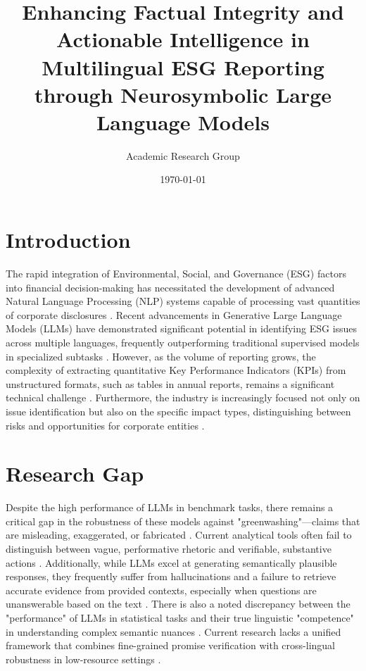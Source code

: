 \documentclass{article}
\title{Enhancing Factual Integrity and Actionable Intelligence in Multilingual ESG Reporting through Neurosymbolic Large Language Models}
\author{Academic Research Group}
\date{\today}
\begin{document}
\maketitle

\section{Introduction}
The rapid integration of Environmental, Social, and Governance (ESG) factors into financial decision-making has necessitated the development of advanced Natural Language Processing (NLP) systems capable of processing vast quantities of corporate disclosures \citep{cite_026}. Recent advancements in Generative Large Language Models (LLMs) have demonstrated significant potential in identifying ESG issues across multiple languages, frequently outperforming traditional supervised models in specialized subtasks \citep{cite_019, cite_024}. However, as the volume of reporting grows, the complexity of extracting quantitative Key Performance Indicators (KPIs) from unstructured formats, such as tables in annual reports, remains a significant technical challenge \citep{cite_030}. Furthermore, the industry is increasingly focused not only on issue identification but also on the specific impact types, distinguishing between risks and opportunities for corporate entities \citep{cite_025, cite_016}.

\section{Research Gap}
Despite the high performance of LLMs in benchmark tasks, there remains a critical gap in the robustness of these models against "greenwashing"—claims that are misleading, exaggerated, or fabricated \citep{cite_032}. Current analytical tools often fail to distinguish between vague, performative rhetoric and verifiable, substantive actions \citep{cite_032}. Additionally, while LLMs excel at generating semantically plausible responses, they frequently suffer from hallucinations and a failure to retrieve accurate evidence from provided contexts, especially when questions are unanswerable based on the text \citep{cite_022}. There is also a noted discrepancy between the "performance" of LLMs in statistical tasks and their true linguistic "competence" in understanding complex semantic nuances \citep{cite_023}. Current research lacks a unified framework that combines fine-grained promise verification with cross-lingual robustness in low-resource settings \citep{cite_027, cite_015}.
\end{document}
